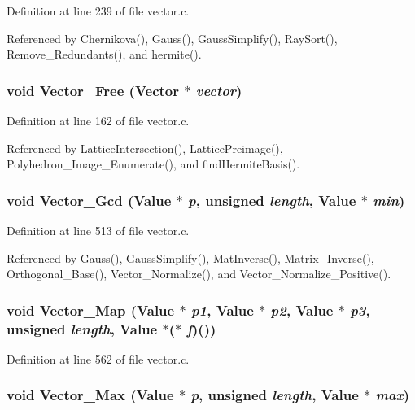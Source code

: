 Definition at line 239 of file vector.c.

Referenced by Chernikova(), Gauss(), Gauss\-Simplify(), Ray\-Sort(), Remove\_\-Redundants(), and hermite().

\subsubsection{\setlength{\rightskip}{0pt plus 5cm}void Vector\_\-Free (Vector $\ast$ {\em vector})}\label{vector_8c_a6}




Definition at line 162 of file vector.c.

Referenced by Lattice\-Intersection(), Lattice\-Preimage(), Polyhedron\_\-Image\_\-Enumerate(), and find\-Hermite\-Basis().

\subsubsection{\setlength{\rightskip}{0pt plus 5cm}void Vector\_\-Gcd (Value $\ast$ {\em p}, unsigned {\em length}, Value $\ast$ {\em min})}\label{vector_8c_a23}




Definition at line 513 of file vector.c.

Referenced by Gauss(), Gauss\-Simplify(), Mat\-Inverse(), Matrix\_\-Inverse(), Orthogonal\_\-Base(), Vector\_\-Normalize(), and Vector\_\-Normalize\_\-Positive().

\subsubsection{\setlength{\rightskip}{0pt plus 5cm}void Vector\_\-Map (Value $\ast$ {\em p1}, Value $\ast$ {\em p2}, Value $\ast$ {\em p3}, unsigned {\em length}, Value $\ast$($\ast$ {\em f})())}\label{vector_8c_a24}




Definition at line 562 of file vector.c.
\subsubsection{\setlength{\rightskip}{0pt plus 5cm}void Vector\_\-Max (Value $\ast$ {\em p}, unsigned {\em length}, Value $\ast$ {\em max})}\label{vector_8c_a18}





